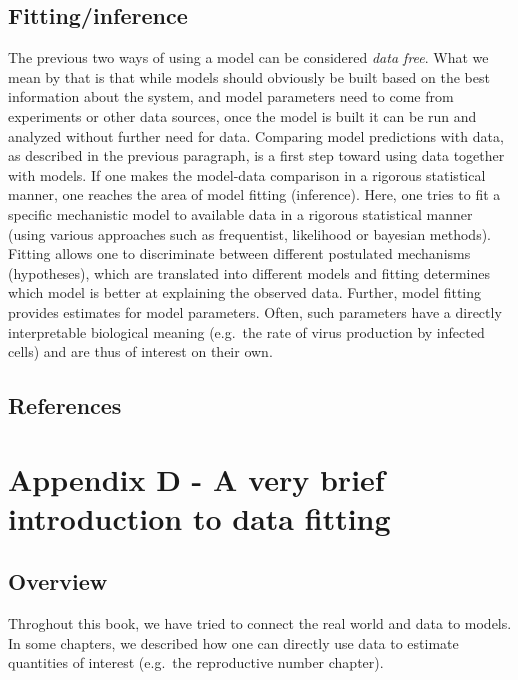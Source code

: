 \documentclass[
]{book}
\begin{document}
\hypertarget{fittinginference}{%
\section{Fitting/inference}\label{fittinginference}}

The previous two ways of using a model can be considered \emph{data free}. What we mean by that is that while models should obviously be built based on the best information about the system, and model parameters need to come from experiments or other data sources, once the model is built it can be run and analyzed without further need for data. Comparing model predictions with data, as described in the previous paragraph, is a first step toward using data together with models. If one makes the model-data comparison in a rigorous statistical manner, one reaches the area of model fitting (inference). Here, one tries to fit a specific mechanistic model to available data in a rigorous statistical manner (using various approaches such as frequentist, likelihood or bayesian methods). Fitting allows one to discriminate between different postulated mechanisms (hypotheses), which are translated into different models and fitting determines which model is better at explaining the observed data. Further, model fitting provides estimates for model parameters. Often, such parameters have a directly interpretable biological meaning (e.g.~the rate of virus production by infected cells) and are thus of interest on their own.

\hypertarget{references-21}{%
\section{References}\label{references-21}}

\hypertarget{appendix-d---a-very-brief-introduction-to-data-fitting}{%
\chapter{Appendix D - A very brief introduction to data fitting}\label{appendix-d---a-very-brief-introduction-to-data-fitting}}

\hypertarget{overview-2}{%
\section{Overview}\label{overview-2}}

Throghout this book, we have tried to connect the real world and data to models. In some chapters, we described how one can directly use data to estimate quantities of interest (e.g.~the reproductive number chapter).
\end{document}
